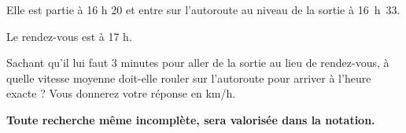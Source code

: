 Elle est partie à 16 h 20 et entre sur l'autoroute au niveau de la sortie  à 16~h~33.

Le rendez-vous est à 17 h.

Sachant qu'il lui faut 3 minutes pour aller de la sortie  au lieu de rendez-vous, à quelle vitesse moyenne doit-elle rouler sur l'autoroute pour arriver à l'heure exacte ? Vous donnerez votre réponse
en km/h.

\textbf{Toute recherche même incomplète, sera valorisée dans la notation.}

\vspace{0,5cm}


